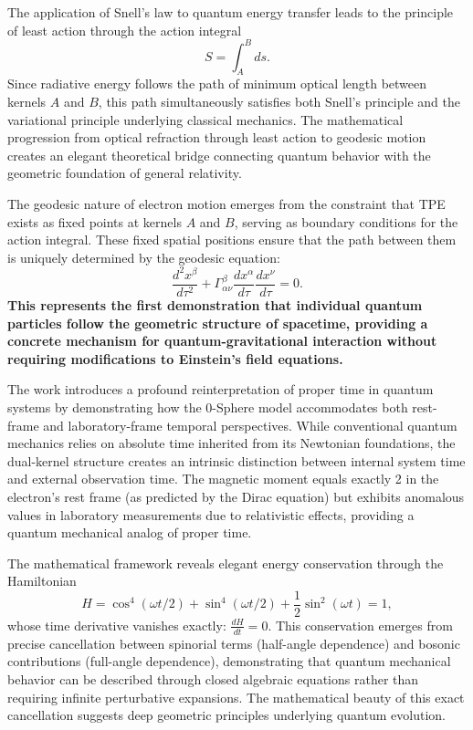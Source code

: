 \documentclass[%
 reprint,
 amsmath,amssymb,
 aps,
]{revtex4-1}
\numberwithin{equation}{section}%
\begin{document}
The application of Snell's law to quantum energy transfer leads to the principle of least action through the action integral
\begin{equation}
S = \int_A^B ds.
\end{equation}
Since radiative energy follows the path of minimum optical length between kernels $A$ and $B$, this path simultaneously satisfies both Snell's principle and the variational principle underlying classical mechanics. The mathematical progression from optical refraction through least action to geodesic motion creates an elegant theoretical bridge connecting quantum behavior with the geometric foundation of general relativity.

The geodesic nature of electron motion emerges from the constraint that TPE exists as fixed points at kernels $A$ and $B$, serving as boundary conditions for the action integral. These fixed spatial positions ensure that the path between them is uniquely determined by the geodesic equation: 
\begin{equation}
\frac{d^2x^\beta}{d\tau^2} + \Gamma^\beta_{\alpha\nu}\frac{dx^\alpha}{d\tau}\frac{dx^\nu}{d\tau} = 0.
\end{equation}
\textbf{This represents the first demonstration that individual quantum particles follow the geometric structure of spacetime, providing a concrete mechanism for quantum-gravitational interaction without requiring modifications to Einstein's field equations.}

The work introduces a profound reinterpretation of proper time in quantum systems by demonstrating how the 0-Sphere model accommodates both rest-frame and laboratory-frame temporal perspectives. While conventional quantum mechanics relies on absolute time inherited from its Newtonian foundations, the dual-kernel structure creates an intrinsic distinction between internal system time and external observation time. The magnetic moment equals exactly 2 in the electron's rest frame (as predicted by the Dirac equation) but exhibits anomalous values in laboratory measurements due to relativistic effects, providing a quantum mechanical analog of proper time.

The mathematical framework reveals elegant energy conservation through the Hamiltonian 
\begin{equation}
H = \cos^4(\omega t/2) + \sin^4(\omega t/2) + \frac{1}{2}\sin^2(\omega t) = 1,
\end{equation}
whose time derivative vanishes exactly: $\frac{dH}{dt} = 0$. This conservation emerges from precise cancellation between spinorial terms (half-angle dependence) and bosonic contributions (full-angle dependence), demonstrating that quantum mechanical behavior can be described through closed algebraic equations rather than requiring infinite perturbative expansions. The mathematical beauty of this exact cancellation suggests deep geometric principles underlying quantum evolution.
\end{document}
